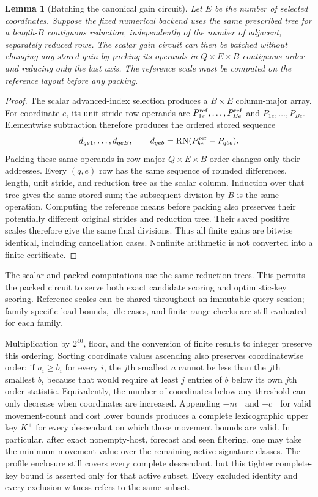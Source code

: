 \documentclass[11pt]{article}
\newtheorem{lemma}{Lemma}
\begin{document}
\begin{lemma}[Batching the canonical gain circuit]
Let $E$ be the number of selected coordinates.  Suppose the fixed numerical backend uses the same prescribed tree for a length-$B$ contiguous reduction, independently of the number of adjacent, separately reduced rows.  The scalar gain circuit can then be batched without changing any stored gain by packing its operands in $Q\times E\times B$ contiguous order and reducing only the last axis.  The reference scale must be computed on the reference layout before any packing.
\end{lemma}
\begin{proof}
The scalar advanced-index selection produces a $B\times E$ column-major array.  For coordinate $e$, its unit-stride row operands are $P^{\rm ref}_{1e},\ldots,P^{\rm ref}_{Be}$ and $P_{1e},\ldots,P_{Be}$.  Elementwise subtraction therefore produces the ordered stored sequence
\[
 d_{qe1},\ldots,d_{qeB},\qquad
 d_{qeb}=\operatorname{RN}(P^{\rm ref}_{be}-P_{qbe}).
\]
Packing these same operands in row-major $Q\times E\times B$ order changes only their addresses.  Every $(q,e)$ row has the same sequence of rounded differences, length, unit stride, and reduction tree as the scalar column. Induction over that tree gives the same stored sum; the subsequent division by $B$ is the same operation.  Computing the reference means before packing also preserves their potentially different original strides and reduction tree.  Their saved positive scales therefore give the same final divisions. Thus all finite gains are bitwise identical, including cancellation cases. Nonfinite arithmetic is not converted into a finite certificate.
\end{proof}

The scalar and packed computations use the same reduction trees. This permits the packed circuit to serve both exact candidate scoring and optimistic-key scoring. Reference scales can be shared throughout an immutable query session; family-specific load bounds, idle cases, and finite-range checks are still evaluated for each family.

Multiplication by $2^{40}$, floor, and the conversion of finite results to integer preserve this ordering.  Sorting coordinate values ascending also preserves coordinatewise order: if $a_i\ge b_i$ for every $i$, the $j$th smallest $a$ cannot be less than the $j$th smallest $b$, because that would require at least $j$ entries of $b$ below its own $j$th order statistic. Equivalently, the number of coordinates below any threshold can only decrease when coordinates are increased.  Appending $-m^-$ and $-c^-$ for valid movement-count and cost lower bounds produces a complete lexicographic upper key $K^+$ for every descendant on which those movement bounds are valid. In particular, after exact nonempty-host, forecast and seen filtering, one may take the minimum movement value over the remaining active signature classes. The profile enclosure still covers every complete descendant, but this tighter complete-key bound is asserted only for that active subset.  Every excluded identity and every exclusion witness refers to the same subset.
\end{document}
